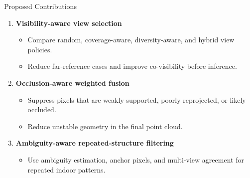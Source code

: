 \documentclass[aspectratio=169,11pt]{beamer}
\begin{document}
\begin{frame}{Proposed Contributions}
\begin{enumerate}
    \item \textbf{Visibility-aware view selection}
    \begin{itemize}
        \item Compare random, coverage-aware, diversity-aware, and hybrid view policies.
        \item Reduce far-reference cases and improve co-visibility before inference.
    \end{itemize}

    \item \textbf{Occlusion-aware weighted fusion}
    \begin{itemize}
        \item Suppress pixels that are weakly supported, poorly reprojected, or likely occluded.
        \item Reduce unstable geometry in the final point cloud.
    \end{itemize}

    \item \textbf{Ambiguity-aware repeated-structure filtering}
    \begin{itemize}
        \item Use ambiguity estimation, anchor pixels, and multi-view agreement for repeated indoor patterns.
    \end{itemize}
\end{enumerate}
\end{frame}
\end{document}
